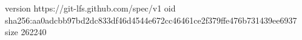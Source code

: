 version https://git-lfs.github.com/spec/v1
oid sha256:aa0adcbb97bd2dc833df46d4544e672cc46461ce2f379ffe476b731439ee6937
size 262240
